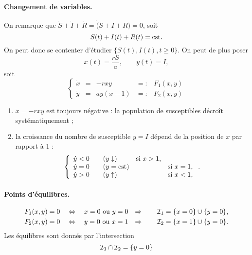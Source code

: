 \paragraph*{Changement de variables.}
On remarque que $\dot S + \dot I + \dot R = \dot (S + I + R) = 0$, soit 
$$
S(t) + I(t) + R(t) = \text{cst}.
$$
On peut donc se contenter d'étudier $\{S(t), I(t), t \geq 0\}$. On peut de plus poser 
$$
x(t) = \frac{rS}a, \qquad y(t) = I,
$$
soit
$$
\left\{\begin{array}{rclcl}
        \dot x & = & -r x y & =: & F_1(x, y) \\
        \dot y & = & a y (x - 1) & =: & F_2(x, y)
       \end{array}\right.
$$

\remarks
\begin{enumerate}
  \item $\dot x = - rxy$ est toujours négative : la population de susceptibles décroît systématiquement ; 
  \item la croissance du nombre de susceptible $y = I$ dépend de la position de $x$ par rapport à 1 :
  $$
  \left\{\begin{array}{lllll}
                \dot y < 0 & & (y \downarrow) & \text{si } x > 1, \\
                \dot y = 0 & & (y = \text{cst}) & & \text{si } x = 1, \\
                \dot y > 0 & & (y \uparrow) & & \text{si } x < 1,
                \end{array}\right..
  $$
\end{enumerate}


\paragraph*{Points d'équilibres.}
\begin{align*}
  F_1(x, y) & = 0 \quad \Leftrightarrow \quad x = 0 \text{ ou } y = 0 &
  \Rightarrow \qquad \mathcal{I}_1 & = \{x = 0\} \cup \{y = 0\}, \\
  F_2(x, y) & = 0 \quad \Leftrightarrow \quad y = 0 \text{ ou } x = 1 &
  \Rightarrow \qquad \mathcal{I}_2 & = \{x = 1\} \cup \{y = 0\}.
\end{align*}
Les équilibres sont donnés par l'intersection 
$$
\mathcal{I}_1 \cap \mathcal{I}_2 = \{y = 0\}
$$

